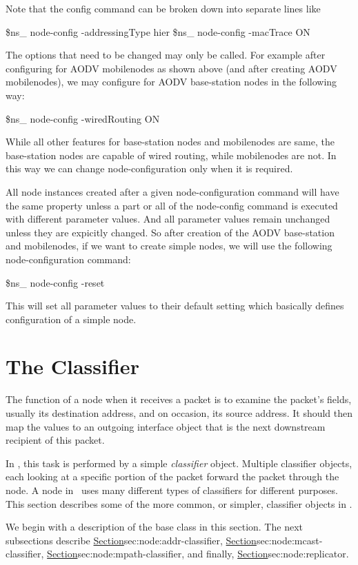 Note that the config command can be broken down into separate lines like
\begin{program}
        \$ns_ node-config -addressingType hier
        \$ns_ node-config -macTrace ON
\end{program}
The options that need to be changed may only be called. For example after
configuring for AODV mobilenodes as shown above (and after creating AODV
mobilenodes), we may configure for AODV base-station nodes in the
following way: 
\begin{program}
        \$ns_ node-config -wiredRouting ON
\end{program}
While all other features for base-station nodes and mobilenodes are same,
the base-station nodes are capable of wired routing, while mobilenodes are
not. In this way we can change node-configuration only when it is required.

All node instances created after a given node-configuration command will
have the same property unless a part or all of the node-config command is
executed with different parameter values. And all parameter values remain
unchanged unless they are expicitly changed. So after creation of the AODV
base-station and mobilenodes, if we want to create simple nodes, we will
use the following node-configuration command:
\begin{program}
        \$ns_ node-config -reset
\end{program}
This will set all parameter values to their default setting which
basically defines configuration of a simple node.


\section{The Classifier}
\label{sec:node:classifiers}

The function of a node when it receives a packet is to examine
the packet's fields, usually its destination address, and
on occasion, its source address.
It should then map the values to an outgoing interface object
that is the next downstream recipient of this packet.

In \ns, this task is performed by a simple \emph{classifier} object.
Multiple classifier objects,
each looking at a specific portion of the packet
forward the packet through the node.
A node in \ns\ uses many different types of classifiers for different purposes.
This section describes some of the more common, or simpler,
classifier objects in \ns.

We begin with a description of the base class in this section.
The next subsections describe
\href{the address classifier}{Section}{sec:node:addr-classifier},
\href{the multicast classifier}{Section}{sec:node:mcast-classifier},
\href{the multipath classifier}{Section}{sec:node:mpath-classifier}, and
finally, \href{the replicator}{Section}{sec:node:replicator}.

